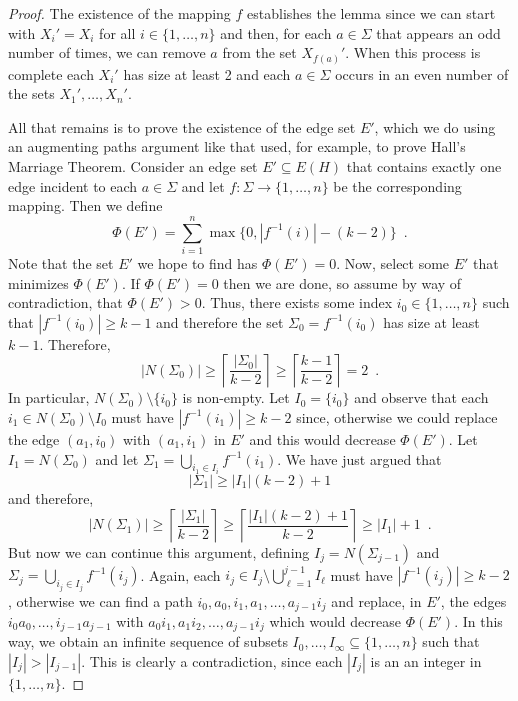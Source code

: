 \documentclass{patmorin}
\begin{document}
\begin{proof}
   The existence of the mapping $f$ establishes the lemma since we can
   start with $X_i'=X_i$ for all $i\in\{1,\ldots,n\}$ and then, for each
   $a\in\Sigma$ that appears an odd number of times, we can remove $a$
   from the set $X_{f(a)}'$.  When this process is complete each $X_i'$
   has size at least 2 and each $a\in\Sigma$ occurs in an even number
   of the sets $X_1',\ldots,X_n'$.

   All that remains is to prove the existence of the edge set $E'$, which
   we do using an augmenting paths argument like that used, for example,
   to prove Hall's Marriage Theorem.  
   Consider an edge set $E'\subseteq E(H)$ that contains exactly 
   one edge incident to each $a\in\Sigma$ and let $f:\Sigma\to\{1,\ldots,n\}$ be the corresponding mapping.  Then we define
   \[
      \Phi(E') = \sum_{i=1}^n\max\{0, |f^{-1}(i)|-(k-2)\} \enspace .
   \]
   Note that the set $E'$ we hope to find has $\Phi(E')=0$.  Now, select
   some $E'$ that minimizes $\Phi(E')$.  If $\Phi(E')=0$ then we are done,
   so assume by way of contradiction, that $\Phi(E') > 0$.  Thus, there
   exists some index $i_0\in\{1,\ldots,n\}$ such that $|f^{-1}(i_0)|\ge k-1$
   and therefore the set $\Sigma_0=f^{-1}(i_0)$ has size at least $k-1$.
   Therefore, 
   \[
       |N(\Sigma_0)| \ge \left\lceil\frac{|\Sigma_0|}{k-2}\right\rceil \ge 
\left\lceil\frac{k-1}{k-2}\right\rceil = 2 \enspace .
   \]
   In particular, $N(\Sigma_0)\setminus\{i_0\}$ is non-empty.
   Let $I_0=\{i_0\}$ and observe that each $i_1\in N(\Sigma_0)\setminus I_0$
   must have $|f^{-1}(i_1)|\ge k-2$ since, otherwise we could replace
   the edge $(a_1,i_0)$ with $(a_1,i_1)$ in $E'$ and this would decrease
   $\Phi(E')$.  Let $I_1=N(\Sigma_0)$ and let $\Sigma_1=\bigcup_{i_1\in I_i} f^{-1}(i_1)$.  We have just argued that 
   \[
        |\Sigma_1|\ge |I_1|(k-2)+1
   \]
   and therefore, 
   \[
          |N(\Sigma_1)| \ge \left\lceil\frac{|\Sigma_1|}{k-2}\right\rceil
            \ge \left\lceil\frac{|I_1|(k-2)+1}{k-2}\right\rceil
            \ge |I_1|+1 \enspace .
   \]
   But now we can continue this argument, defining $I_j=N(\Sigma_{j-1})$
   and $\Sigma_j=\bigcup_{i_j\in I_j} f^{-1}(i_j)$.  Again, each $i_j\in
   I_j\setminus \bigcup_{\ell=1}^{j-1} I_\ell$ must have $|f^{-1}(i_j)|\ge
   k-2$, otherwise we can find a path $i_0,a_0,i_1,a_1,\ldots,a_{j-1}i_j$
   and replace, in $E'$,
   the edges $i_0a_0,\ldots,i_{j-1}a_{j-1}$ with $a_0i_1,a_1i_2,\ldots,a_{j-1}i_j$ which would decrease $\Phi(E')$.
   In this way, we obtain an infinite
   sequence of subsets $I_0,\ldots,I_\infty\subseteq \{1,\ldots,n\}$
   such that $|I_{j}|>|I_{j-1}|$.  This is clearly a contradiction,
   since each $|I_j|$ is an an integer in $\{1,\ldots,n\}$.
\end{proof}
\end{document}
